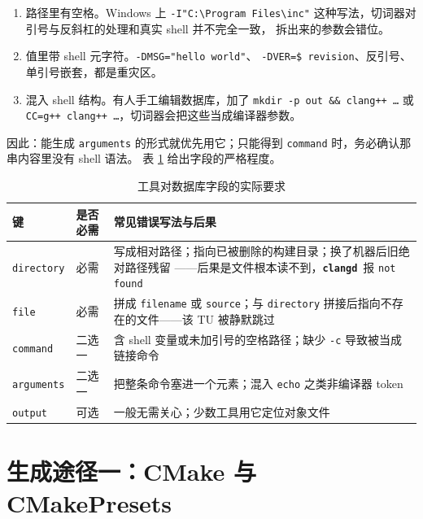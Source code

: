 \documentclass[12pt,a4paper,fontset=fandol]{ctexbook}
\newcommand{\Lib}[1]{\textbf{\texttt{#1}}}
\newcommand{\CD}{\Lib{clangd}}
\begin{document}
\begin{enumerate}
  \item 路径里有空格。Windows 上 \texttt{-I"C:\textbackslash Program Files\textbackslash inc"}
        这种写法，切词器对引号与反斜杠的处理和真实 shell 并不完全一致，
        拆出来的参数会错位。
  \item 值里带 shell 元字符。\texttt{-DMSG="hello world"}、
        \texttt{-DVER=\$ revision}、反引号、单引号嵌套，都是重灾区。
  \item 混入 shell 结构。有人手工编辑数据库，加了
        \texttt{mkdir -p out \&\& clang++ \dots} 或
        \texttt{CC=g++ clang++ \dots}，切词器会把这些当成编译器参数。
\end{enumerate}

因此：能生成 \texttt{arguments} 的形式就优先用它；只能得到
\texttt{command} 时，务必确认那串内容里没有 shell 语法。
表 \ref{tab:ch02-field} 给出字段的严格程度。

\begin{table}[htbp]
\centering
\caption{工具对数据库字段的实际要求}
\label{tab:ch02-field}
\begin{tabular}{@{}>{\raggedright\arraybackslash\small}p{}
                 >{\raggedright\arraybackslash\small}p{}
                 >{\raggedright\arraybackslash\small}p{}@{}}
\toprule
键 & 是否必需 & 常见错误写法与后果 \\
\midrule
\texttt{directory} & 必需 &
  写成相对路径；指向已被删除的构建目录；换了机器后旧绝对路径残留
  ——后果是文件根本读不到，\CD\ 报 \texttt{not found} \\
\texttt{file} & 必需 &
  拼成 \texttt{filename} 或 \texttt{source}；与 \texttt{directory}
  拼接后指向不存在的文件——该 TU 被静默跳过 \\
\texttt{command} & 二选一 &
  含 shell 变量或未加引号的空格路径；缺少 \texttt{-c}
  导致被当成链接命令 \\
\texttt{arguments} & 二选一 &
  把整条命令塞进一个元素；混入 \texttt{echo} 之类非编译器 token \\
\texttt{output} & 可选 &
  一般无需关心；少数工具用它定位对象文件 \\
\bottomrule
\end{tabular}
\end{table}

\section{生成途径一：CMake 与 CMakePresets}
\label{sec:ch02-s2}
\end{document}
